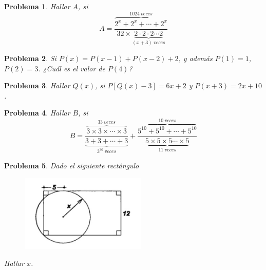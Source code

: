 \documentclass[12pt]{beamer}
\newtheorem{section-problem}{Problema}
\begin{document}
   \begin{frame}
      \begin{section-problem}
         Hallar $A$, si
         \[
            A = \frac{\overbrace{2^x + 2^x + \cdots + 2^x}^{1024 \ veces}}{32 \times \underbrace{2 \cdot 2 \cdot 2 \cdots 2}_{(x + 3) \ veces}}
         \]
      \end{section-problem}
   \end{frame}

   \begin{frame}
      \begin{section-problem}
         Si $P(x) =  P(x - 1) + P(x - 2) + 2$, y además $P(1) = 1$, $P(2) = 3$.
         ¿Cuál es el valor de $P(4)$?
      \end{section-problem}
   \end{frame}

   \begin{frame}
      \begin{section-problem}
         Hallar $Q(x)$, si $P\left[Q(x) - 3\right] = 6x + 2$ y $P(x + 3) = 2x + 10$.
      \end{section-problem}
   \end{frame}

   \begin{frame}
      \begin{section-problem}
         Hallar $B$, si
         \[
            B = \frac{\overbrace{3 \times 3 \times \cdots \times 3}^{33 \ veces}}{\underbrace{3 + 3 +  \cdots + 3}_{3^{30}\ veces}}
            + \frac{\overbrace{5^{10} + 5^{10} + \cdots + 5^{10}}^{10 \ veces}}{\underbrace{5 \times 5 \times 5 \cdots \times 5}_{11 \ veces}}
         \]
      \end{section-problem}
   \end{frame}

   \begin{frame}
      \begin{section-problem}
         Dado el siguiente rectángulo
         \begin{figure}[htb]
            \centering
            \includegraphics[width=6cm]{image1.geo}
         \end{figure}
         Hallar $x$.
      \end{section-problem}
   \end{frame}
\end{document}
